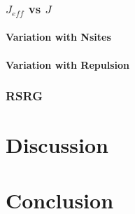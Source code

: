 \documentclass[ openright,titlepage,numbers=noenddot,headinclude,twoside,%
                footinclude=true,cleardoublepage=empty,abstractoff,%
                BCOR=5mm,paper=a4,fontsize=11pt,%
                ngerman,american,%
]{scrreprt}
\begin{document}
\subsection{$J_{eff}$ vs $J$}
\subsubsection{Variation with Nsites}
\subsubsection{Variation with Repulsion}

\subsection{RSRG}

\chapter{Discussion}

\chapter{Conclusion}
\end{document}

